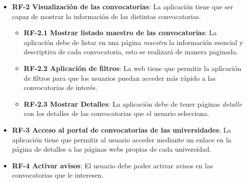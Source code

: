 \begin{itemize}
\item\textbf{RF-2 Visualización de las convocatorias}: La aplicación tiene que ser capaz de mostrar la información de las distintas convocatorias.
\begin{itemize}
\item\textbf{RF-2.1 Mostrar listado maestro de las convocatorias}: La aplicación debe de listar en una página \textit{maestra} la información esencial y descriptiva de cada convocatoria, esto se realizará de manera paginada.
\item\textbf{RF-2.2 Aplicación de filtros}: La web tiene que permitir la aplicación de filtros para que los usuarios puedan acceder más rápido a las convocatorias de interés.
\item\textbf{RF-2.3 Mostrar Detalles}: La aplicación debe de tener páginas \textit{detalle} con los detalles de las convocatorias que el usuario selecciona.

\end{itemize}

\item\textbf{RF-3 Acceso al portal de convocatorias de las universidades}: La aplicación tiene que permitir al usuario acceder mediante un enlace en la página de detalles a las páginas webs propias de cada universidad.

\item\textbf{RF-4 Activar avisos}: El usuario debe poder activar avisos en las convocatorias que le interesen.


\end{itemize}
